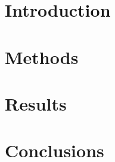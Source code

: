 \documentclass{article}
\title{\cTitle}
\author{\cAuthor}
\begin{document}
\maketitle

\section*{Introduction}
\section*{Methods}
\section*{Results}
\section*{Conclusions}
\end{document}
